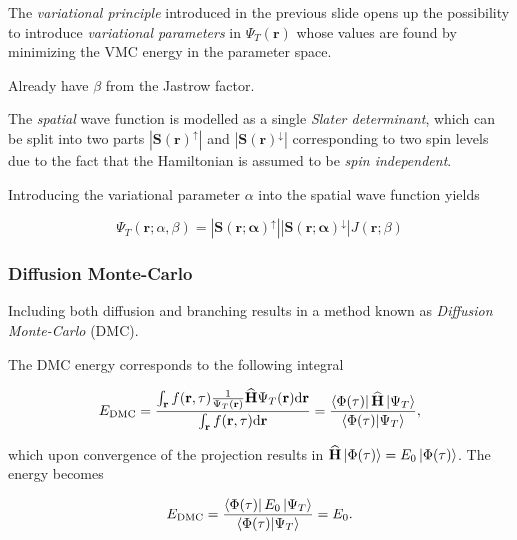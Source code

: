 \begin{frame}
 The \textit{variational principle} introduced in the previous slide opens up the possibility to introduce \textit{variational parameters} in $\Psi_T(\mathbf{r})$ whose values are found by minimizing the VMC energy in the parameter space.
 \shift
 
 Already have $\beta$ from the Jastrow factor. 
 \shift
 
 The \textit{spatial} wave function is modelled as a single \textit{Slater determinant}, which can be split into two parts $|\mathbf{S(\mathbf{r})}^\uparrow|$ and $|\mathbf{S(\mathbf{r})}^\downarrow|$ corresponding to two spin levels due to the fact that the Hamiltonian is assumed to be \emph{spin independent}.
 \shift
 
 Introducing the variational parameter $\alpha$ into the spatial wave function yields
 
 
 \begin{equation}
  \Psi_T(\mathbf{r}; \alpha, \beta) = |\mathbf{S(\mathbf{r}; \alpha)}^\uparrow||\mathbf{S(\mathbf{r}; \alpha)}^\downarrow|J(\mathbf{r}; \beta)
 \end{equation}

 
 
\end{frame}

\begin{frame}
\frametitle{Diffusion Monte-Carlo}
Including both diffusion and branching results in a method known as \textit{Diffusion Monte-Carlo} (DMC).
\shift

The DMC energy corresponds to the following integral

\begin{equation}
 E_{\mathrm{DMC}} = \frac{\int_\mathbf{r} f(\mathbf{r}, \tau) \frac{1}{\Psi_T(\mathbf{r})}{\bf\widehat{H}} \Psi_T(\mathbf{r})\mathrm{d}\mathbf{r}}{\int_\mathbf{r} f(\mathbf{r}, \tau)\mathrm{d}\mathbf{r}}  = \frac{\left< \Phi(\tau) \right| {\bf\widehat{H}} \left| \Psi_T \right>}{\left\langle \Phi(\tau) | \Psi_T\right\rangle},
\end{equation}

\pause
which upon convergence of the projection results in ${\bf\widehat{H}}\left| \Phi(\tau) \right> = E_0\left| \Phi(\tau) \right>$. The energy becomes

\begin{equation}
 E_{\mathrm{DMC}} = \frac{\left< \Phi(\tau) \right|E_0\left| \Psi_T \right>}{\left\langle \Phi(\tau) | \Psi_T\right\rangle} = E_0.
\end{equation}

\end{frame}

